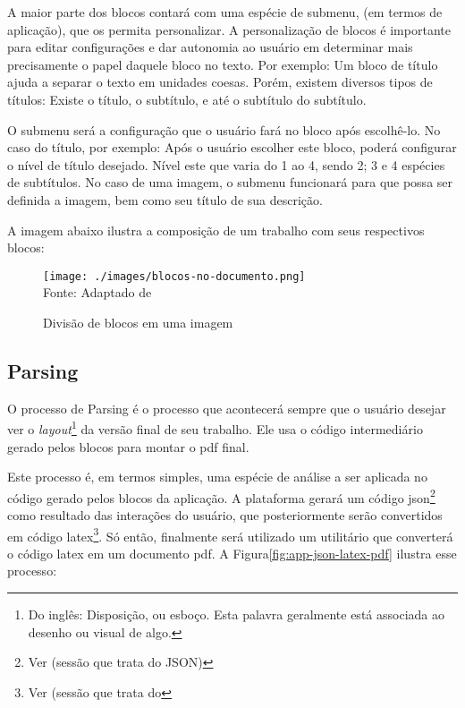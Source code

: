 A maior parte dos blocos contará com uma espécie de submenu, (em termos de aplicação),
que os permita personalizar. A personalização de blocos é importante para editar
configurações e dar autonomia ao usuário em determinar mais precisamente o papel
daquele bloco no texto. Por exemplo: Um bloco de título ajuda a separar o texto
em unidades coesas. Porém, existem diversos tipos de títulos: Existe o título, o
subtítulo, e até o subtítulo do subtítulo.

O submenu será a configuração que o usuário fará no bloco após escolhê-lo. No
caso do título, por exemplo: Após o usuário escolher este bloco, poderá configurar
o nível de título desejado. Nível este que varia do 1 ao 4, sendo 2; 3 e 4
espécies de subtítulos. No caso de uma imagem, o submenu funcionará para que possa
ser definida a imagem, bem como seu título de sua descrição.

A imagem abaixo ilustra a composição de um trabalho com seus respectivos blocos:

\begin{figure}[H]
    \centering
    \caption{Divisão de blocos em uma imagem}
    \texttt{[image: ./images/blocos-no-documento.png]}
    \label{fig:blocos-no-documento} \\
    \textnormal{\fontsize{10pt}{12pt}Fonte: Adaptado de \cite{pucgo}}
\end{figure}

\subsection{Parsing}

O processo de Parsing é o processo que acontecerá sempre que o usuário desejar
ver o
\textit{layout}\footnote{Do inglês: Disposição, ou esboço. Esta palavra geralmente está associada ao desenho ou visual de algo.
}
da versão final de seu trabalho. Ele usa o código intermediário gerado pelos blocos para montar o
\acrshort{pdf}
final.

Este processo é, em termos simples, uma espécie de análise a ser aplicada no código gerado pelos blocos
da aplicação. A plataforma gerará um código
\acrshort{json}\footnote{Ver (sessão que trata do JSON)
}
como resultado das interações do usuário, que posteriormente
serão convertidos em código
\acrshort{latex}\footnote{Ver (sessão que trata do }.
Só então, finalmente será utilizado um utilitário que converterá o código \acrshort{latex}
em um documento
\acrshort{pdf}. A
Figura\ref{fig:app-json-latex-pdf} ilustra esse processo:

